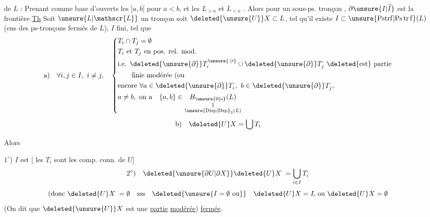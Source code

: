  de $L$  : Prenant comme base d'ouverts les  $]a,b[$ pour $a<b$, et les $L_{>a}$ et $L_{<a}$ \unsure{(}. Alors  pour un sous-ps. tronçon , $\partial\unsure{I|\widehat I}$ est la frontière
\margin{\uline{NB} Il n'y a pas besoin d'introduire les $L_{>a}$ \unsure{et} si $L$ \unsure{n'a} pas de plus grand élément, et \unsure{itou|idem} pour $L_{<a}$ si \unsure{$a$|$L$} n'a pas de \unsure{plus} petit élément. \unsure{Dans ce cas|Dans} \illegible{2} $]a,b[$ \unsure{eux} \illegible{2} $]a,b[$.}
\uline{Th} Soit $\unsure{L|\mathscr{L}}$ un tronçon \unsure{;|,} soit $\deleted{\unsure{U}}X\subset L$, tel qu'il existe $I\subset\unsure{\mathrm{Pstrf}|\mathrm{Ps\,tr\,f}}(L)$ (ens des ps-tronçons fermés de $L$), $I$ fini,  tel que
\[
\begin{aligned}
\text{a)}\quad \forall i,j\in I,\ i\ne j,\quad
\left\{\begin{aligned}
&T_i\cap T_j=\emptyset\\
&T_i\text{ et }T_j\text{ en pos. rel. mod.}\\
&\text{i.e. }\deleted{\unsure{\partial}}T_i^{\unsure{\cdot|\prime}}\cup \deleted{\unsure{\partial}}T_j^{\cdot}\ \text{\deleted{est} partie}\\
&\qquad\text{finie modérée (ou}\\
&\text{encore }\forall a\in\deleted{\unsure{\partial}}T_i^{\cdot},\ b\in\deleted{\unsure{\partial}}T_j^{\cdot},\\
&a\ne b,\ \text{on a}\quad\{a,b\}\in\underset{\substack{\Vert\\\unsure{\mathrm{Disp}|\mathrm{Dsp}}_2(L)}}{B_{\unsure{0|o}}(L)}
\end{aligned}\right.
\end{aligned}
\]
\[
\text{b)}\quad \deleted{U}X=\bigcup T_i
\]

Alors

$1^\circ$) $I$ est  [ les $T_i$ sont les comp. conn. de $U$]
\[
\text{$2^\circ$)}\quad \deleted{\unsure{\partial U|\partial X}}\deleted{U}X^{\cdot}=\bigcup_{i\in I}T_i^{\cdot}
\]
\[
(\text{donc }\deleted{U}X^{\cdot}=\emptyset\quad\text{sss}\quad\deleted{\unsure{I=\emptyset\ \text{ou}}}\quad\deleted{U}X=L\text{ ou }\deleted{U}X=\emptyset
\]
(On dit que $\deleted{\unsure{U}}X$ est une \uline{partie} \uline{modérée}) \uline{fermée}.

